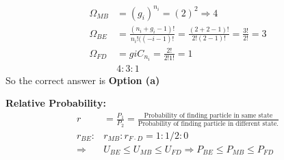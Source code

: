 \begin{answer}
	\begin{align*}
	\Omega_{M B}&=\left(g_{i}\right)^{n_{i}}=(2)^{2} \Rightarrow 4 \\
	\Omega_{B E}&=\frac{\left(n_{i}+g_{i}-1\right) !}{n_{i} !((-i-1) !}=\frac{(2+2-1) !}{2 !(2-1) !}=\frac{3 !}{2 !}=3\\
	\Omega_{F D}&=g i C_{n_{i}}=\frac{2 !}{2 ! 1 !}=1\\
	&4:3:1
	\end{align*}
	So the correct answer is \textbf{Option (a)}
\end{answer}
\textbf{Relative Probability: }\\
\begin{align*}
r&=\frac{P_1}{P_2}=\frac{\text{Probability of finding particle in same state}}{\text{Probability of finding particle in different state.}}\\
r_{B E}:& r_{M B}: r_{F \cdot D}=1: 1 / 2: 0\\
\Rightarrow& U_{B E} \leqslant U_{M B} \leqslant U_{F D} \Rightarrow P_{B E} \leqslant P_{M B} \leqslant P_{F D} \\\\
\end{align*}

